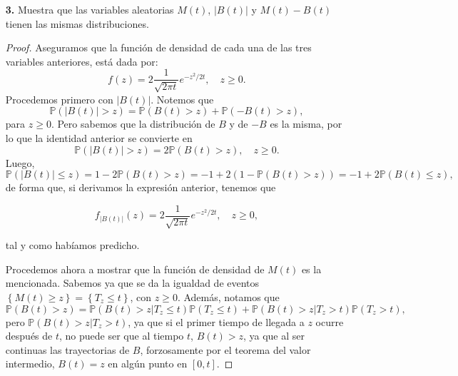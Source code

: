 \documentclass[letterpaper]{article}
\renewcommand{\P}{\mathbb{P}}
\newcommand{\1}{\mathds{1}}
\theoremstyle{definition}
\theoremstyle{definition}
\theoremstyle{definition}
\theoremstyle{definition}
\theoremstyle{definition}
\begin{document}
\begin{enumerate}
    \item [\textbf{3.}] Muestra que las variables aleatorias $M(t)$, $|B(t)|$ y 
    $M(t)-B(t)$ tienen las mismas distribuciones.
    \begin{proof} 
      Aseguramos que la función de densidad de cada una de las tres variables anteriores, 
      está dada por:
      \[
      f(z)=2\frac{1}{\sqrt{2\pi t}}e^{-z^2/2t}, \quad z\geq0.  
      \]
      Procedemos primero con $|B(t)|$. Notemos que
      \[
      \P\left(|B(t)|> z\right)=\P\left(B(t)> z\right) + \P\left(-B(t)>z\right),  
      \]
      para $z\geq0$. Pero sabemos que la distribución de $B$ y de $-B$ es la misma,
      por lo que la identidad anterior se convierte en 
      \begin{equation}
        \P\left(|B(t)|>z\right)=2\P\left(B(t)>z\right), \quad z\geq 0.  
      \end{equation}
          Luego, 
      \[
        \P\left(|B(t)|\leq z\right)=1-2\P\left(B(t)>z\right)=-1+2(1-\P\left(B(t)>z\right))=-1+2\P\left(B(t)\leq z\right),
      \]
      de forma que, si derivamos la expresión anterior, tenemos que
      
      \begin{equation}
        f_{|B(t)|}(z)=2\frac{1}{\sqrt{2\pi t}}e^{-z^2/2t}, \quad z\geq0,
      \end{equation}
      
      tal y como habíamos predicho.
      \newline

      Procedemos ahora a mostrar que la función de densidad de $M(t)$ es la mencionada.
      Sabemos ya que se da la igualdad de eventos $\left\{M(t)\geq z\right\}=\left\{T_z\leq t\right\}$, con $z\geq0$.
      Además, notamos que 
      \[
      \P\left(B(t)>z\right)=\P\left(B(t)>z|T_z\leq t\right)\P\left(T_z\leq t\right)+\P\left(B(t)>z|T_z> t\right)\P\left(T_z> t\right),
      \]
      pero $\P\left(B(t)>z|T_z>t\right)$, ya que si el primer tiempo de llegada a $z$ ocurre después de $t$, no puede ser que al tiempo
      $t$, $B(t)>z$, ya que al ser continuas las trayectorias de $B$, forzosamente por el teorema del valor intermedio, $B(t)=z$ en 
      algún punto en $[0,t]$.
      \newline


\end{proof}
\end{enumerate}
\end{document}
